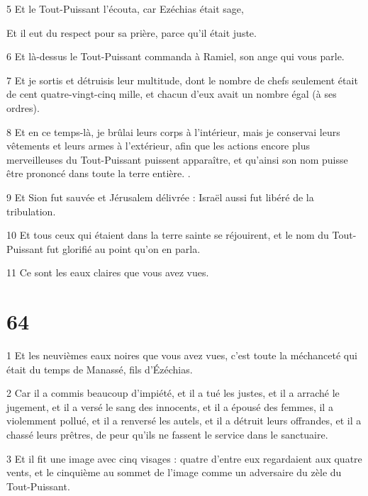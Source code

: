 \par 5 Et le Tout-Puissant l'écouta, car Ezéchias était sage,

\par Et il eut du respect pour sa prière, parce qu'il était juste.

\par 6 Et là-dessus le Tout-Puissant commanda à Ramiel, son ange qui vous parle.

\par 7 Et je sortis et détruisis leur multitude, dont le nombre de chefs seulement était de cent quatre-vingt-cinq mille, et chacun d'eux avait un nombre égal (à ses ordres).

\par 8 Et en ce temps-là, je brûlai leurs corps à l'intérieur, mais je conservai leurs vêtements et leurs armes à l'extérieur, afin que les actions encore plus merveilleuses du Tout-Puissant puissent apparaître, et qu'ainsi son nom puisse être prononcé dans toute la terre entière. .

\par 9 Et Sion fut sauvée et Jérusalem délivrée : Israël aussi fut libéré de la tribulation.

\par 10 Et tous ceux qui étaient dans la terre sainte se réjouirent, et le nom du Tout-Puissant fut glorifié au point qu'on en parla.

\par 11 Ce sont les eaux claires que vous avez vues.

\chapter{64}

\par 1 Et les neuvièmes eaux noires que vous avez vues, c'est toute la méchanceté qui était du temps de Manassé, fils d'Ézéchias.

\par 2 Car il a commis beaucoup d'impiété, et il a tué les justes, et il a arraché le jugement, et il a versé le sang des innocents, et il a épousé des femmes, il a violemment pollué, et il a renversé les autels, et il a détruit leurs offrandes, et il a chassé leurs prêtres, de peur qu'ils ne fassent le service dans le sanctuaire.

\par 3 Et il fit une image avec cinq visages : quatre d'entre eux regardaient aux quatre vents, et le cinquième au sommet de l'image comme un adversaire du zèle du Tout-Puissant.

